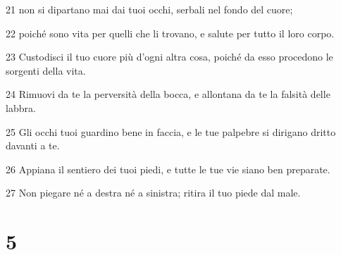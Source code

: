 \par 21 non si dipartano mai dai tuoi occhi, serbali nel fondo del cuore;
\par 22 poiché sono vita per quelli che li trovano, e salute per tutto il loro corpo.
\par 23 Custodisci il tuo cuore più d'ogni altra cosa, poiché da esso procedono le sorgenti della vita.
\par 24 Rimuovi da te la perversità della bocca, e allontana da te la falsità delle labbra.
\par 25 Gli occhi tuoi guardino bene in faccia, e le tue palpebre si dirigano dritto davanti a te.
\par 26 Appiana il sentiero dei tuoi piedi, e tutte le tue vie siano ben preparate.
\par 27 Non piegare né a destra né a sinistra; ritira il tuo piede dal male.

\chapter{5}

